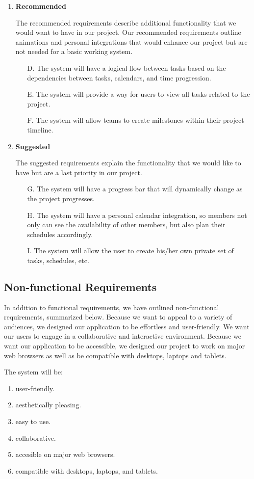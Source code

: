 \begin{enumerate}
\begin{enumerate}
	\end{enumerate}
\item \textbf{Recommended}
\par The recommended requirements describe additional functionality that we would want to have in our project. Our recommended requirements outline animations and personal integrations that would enhance our project but are not needed for a basic working system. 
	\begin{enumerate}
	\item[D.] The system will have a logical flow between tasks based on the dependencies between tasks, calendars, and time progression. 
	\item[E.] The system will provide a way for users to view all tasks related to the project.
	\item[F.] The system will allow teams to create milestones within their project timeline.
	\end{enumerate}
\item \textbf{Suggested}
\par The suggested requirements explain the functionality that we would like to have but are a last priority in our project. 
	\begin{enumerate}
	\item[G.] The system will have a progress bar that will dynamically change as the project progresses.
	\item[H.] The system will have a personal calendar integration, so members not only can see the availability of other members, but also plan their schedules accordingly.
	\item[I.] The system will allow the user to create his/her own private set of tasks, schedules, etc.
	\end{enumerate}
\end{enumerate}
\subsection{Non-functional Requirements}
In addition to functional requirements, we have outlined non-functional requirements, summarized below. Because we want to appeal to a variety of audiences, we designed our application to be effortless and user-friendly. We want our users to engage in a collaborative and interactive environment. Because we want our application to be accessible, we designed our project to work on major web browsers as well as be compatible with desktops, laptops and tablets.
\par The system will be:
\begin{enumerate}
\item user-friendly.
\item aesthetically pleasing.
\item easy to use.
\item collaborative.
\item accesible on major web browsers. 
\item compatible with desktops, laptops, and tablets. 
\end{enumerate}
